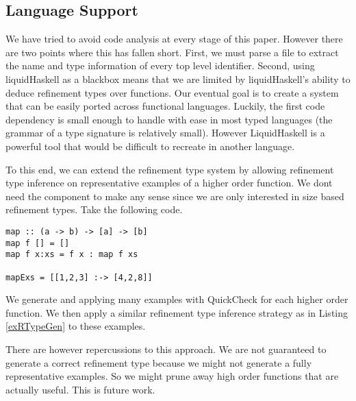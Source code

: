 \subsection{Language Support}\label{languageSupport}

We have tried to avoid code analysis at every stage of this paper. However there are two points where this has fallen short. First, we must parse a file to extract the name and type information of every top level identifier. Second, using liquidHaskell as a blackbox means that we are limited by liquidHaskell's ability to deduce refinement types over functions. Our eventual goal is to create a system that can be easily ported across functional languages. Luckily, the first code dependency is small enough to handle with ease in most typed languages (the grammar of a type signature is relatively small). However LiquidHaskell is a powerful tool that would be difficult to recreate in another language. 

To this end, we can extend the refinement type system by allowing refinement type inference on representative examples of a higher order function. We dont need the component to make any sense since we are only interested in size based refinement types. Take the following code.

\begin{lstlisting}
map :: (a -> b) -> [a] -> [b]
map f [] = [] 
map f x:xs = f x : map f xs

mapExs = [[1,2,3] :-> [4,2,8]]
 \end{lstlisting}

We generate and applying many examples with QuickCheck for each higher order function.
We then apply a similar refinement type inference strategy as in Listing \ref{exRTypeGen} to these examples.

There are however repercussions to this approach. We are not guaranteed to generate a correct refinement type because we might not generate a fully representative examples. So we might prune away high order functions that are actually useful. This is future work.
